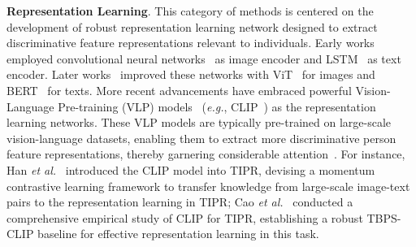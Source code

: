 \documentclass[10pt,journal,compsoc]{IEEEtran}
\begin{document}
\textbf{Representation Learning}.
This category of methods is centered on the development of robust representation learning network designed to extract discriminative feature representations relevant to individuals.
Early works~\cite{chen2018improving, li2017identity, li2017person, chen2021cross, sarafianos2019adversarial} employed convolutional neural networks~\cite{simonyan2014very, he2016deep} as image encoder and LSTM~\cite{hochreiter1997long} as text encoder. Later works~\cite{li2022learning, zhang2018deep} improved these networks with ViT~\cite{dosovitskiy2020image} for images and BERT~\cite{kenton2019bert} for texts. More recent advancements have embraced powerful Vision-Language Pre-training (VLP) models~\cite{radford2021learning, li2021align} (\emph{e.g.}, CLIP~\cite{radford2021learning}) as the representation learning networks. These VLP models are typically pre-trained on large-scale vision-language datasets, enabling them to extract more discriminative person feature representations, thereby garnering considerable attention~\cite{jiang2023cross, bai2023rasa, tan2024harnessing, wu2024text, cao2024empirical}.
For instance, Han \textit{et al.}~\cite{han2021text} introduced the CLIP model into TIPR, devising a momentum contrastive learning framework to transfer knowledge from large-scale image-text pairs to the representation learning in TIPR; Cao \textit{et al.}~\cite{cao2024empirical} conducted a comprehensive empirical study of CLIP for TIPR, establishing a robust TBPS-CLIP baseline for effective representation learning in this task.
\end{document}
